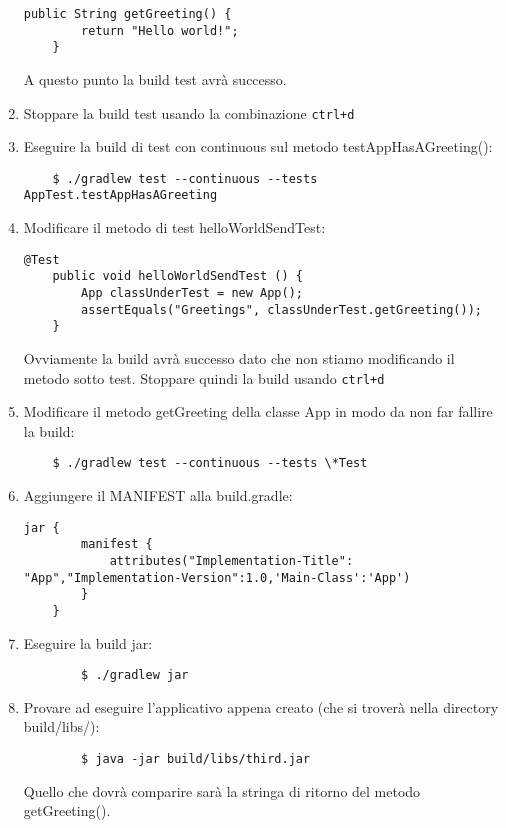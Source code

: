 \begin{enumerate}
    \begin{lstlisting}[frame=single]
    public String getGreeting() {
        return "Hello world!";
    }
    \end{lstlisting}
    A questo punto la build test avrà successo.
    \item Stoppare la build test usando la combinazione \texttt{ctrl+d}
    \item Eseguire la build di test con continuous sul metodo testAppHasAGreeting():
    \begin{verbatim}
    $ ./gradlew test --continuous --tests AppTest.testAppHasAGreeting \end{verbatim}
    \item Modificare il metodo di test helloWorldSendTest:
    \begin{lstlisting}[frame=single]
    @Test 
    public void helloWorldSendTest () {
	    App classUnderTest = new App();
	    assertEquals("Greetings", classUnderTest.getGreeting());
    }
    \end{lstlisting}
    Ovviamente la build avrà successo dato che non stiamo modificando il metodo sotto test. Stoppare quindi la build usando \texttt{ctrl+d}
    \item Modificare il metodo getGreeting della classe App in modo da non far fallire la build:
    \begin{verbatim}
    $ ./gradlew test --continuous --tests \*Test\end{verbatim}
    \item Aggiungere il MANIFEST alla build.gradle:
    \begin{lstlisting}[frame=single]
    jar {
        manifest {
            attributes("Implementation-Title": "App","Implementation-Version":1.0,'Main-Class':'App')
        }
    }
    \end{lstlisting}
    \item Eseguire la build jar:
    \begin{verbatim}
        $ ./gradlew jar\end{verbatim}
    \item Provare ad eseguire l'applicativo appena creato (che si troverà nella directory build/libs/):
    \begin{verbatim}
        $ java -jar build/libs/third.jar \end{verbatim}
    Quello che dovrà comparire sarà la stringa di ritorno del metodo getGreeting().
\end{enumerate}